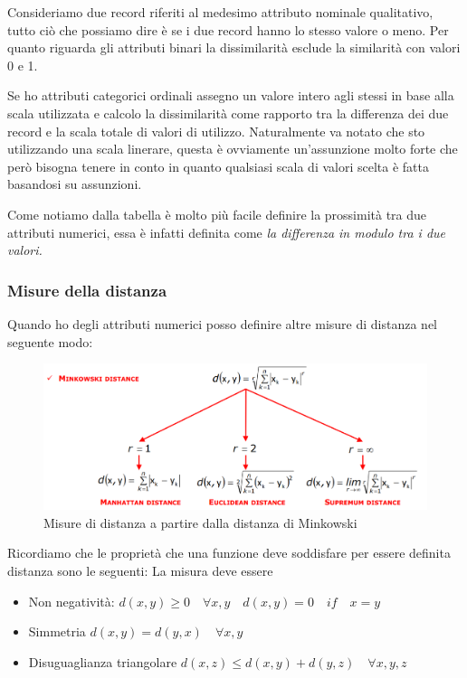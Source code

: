 Consideriamo due record riferiti al medesimo attributo nominale qualitativo, tutto ciò che possiamo dire è se i due record hanno  lo stesso valore o meno.
Per quanto riguarda gli attributi binari la dissimilarità esclude la similarità con valori 0 e 1. 

Se ho attributi categorici ordinali assegno un valore intero agli stessi in base alla scala utilizzata e calcolo la dissimilarità come rapporto tra la differenza dei due record e la scala totale di valori di utilizzo. Naturalmente va notato che sto utilizzando una scala linerare, questa è ovviamente un'assunzione molto forte che però bisogna tenere in conto in quanto qualsiasi scala di valori scelta è fatta basandosi su assunzioni.

Come notiamo dalla tabella è molto più facile definire la prossimità tra due attributi numerici, essa è infatti definita come \textit{la differenza in modulo tra i due valori.}
\subsubsection{Misure della distanza}

Quando ho degli attributi numerici posso definire altre misure di distanza nel seguente modo:
\begin{figure}[H]
	\centering
	\includegraphics[height=0.3 \linewidth]{clustering/pict/distanze_minkowski.png}
	\caption{Misure di distanza a partire dalla distanza di Minkowski}
\end{figure}
Ricordiamo che le proprietà che una funzione deve soddisfare per essere definita distanza sono le seguenti:
La misura deve essere
\begin{itemize}
	\item Non negatività: $d(x,y) \geq 0 \quad \forall x,y \quad d(x,y) = 0 \quad if \quad x = y$
	\item Simmetria $d(x,y) = d(y,x) \quad \forall x,y$
	\item Disuguaglianza triangolare $d(x,z) \leq d(x,y) + d(y,z) \quad \forall x,y,z$
\end{itemize}

